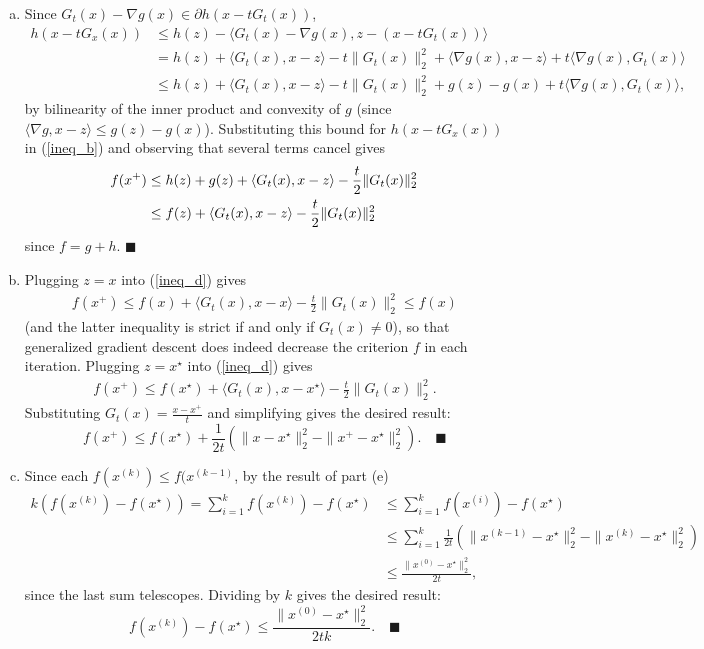 \documentclass[11pt]{article}
\newcommand{\qed}{\quad \ensuremath{\blacksquare}}
\begin{document}
\begin{enumerate}[(a)]
\newpage
\item Since $G_t(x) - \nabla g(x) \in \partial h(x - tG_t(x))$,
\begin{align*}
h(x - tG_x(x))
    & \leq h(z) - \langle G_t(x) - \nabla g(x), z - (x - tG_t(x)) \rangle  \\
    & =    h(z) + \langle G_t(x), x - z             \rangle
                - t\|     G_t(x)                    \|_2^2
                + \langle \nabla g(x), x - z        \rangle
                + t\langle \nabla g(x), G_t(x)      \rangle \\
    & \leq h(z) + \langle G_t(x), x - z             \rangle
                - t\|     G_t(x)                    \|_2^2
                + g(z) - g(x)
                + t\langle \nabla g(x), G_t(x)      \rangle,
\end{align*}
by bilinearity of the inner product and convexity of $g$ (since
$\langle \nabla g, x - z \rangle \leq g(z) - g(x)$). Substituting this bound
for $h(x - tG_x(x))$ in (\ref{ineq_b}) and observing that several terms cancel
gives
\begin{align}
\notag
f(x^+)
 &  \leq h(z) + g(z) + \langle G_t(x), x - z \rangle
    -    \frac{t}{2} \|G_t(x)\|_2^2 \\
\label{ineq_d}
 &  \leq f(z) + \langle G_t(x), x - z \rangle - \frac{t}{2} \|G_t(x)\|_2^2
\end{align}
since $f = g + h$. \qed
 
\item Plugging $z = x$ into (\ref{ineq_d}) gives
\begin{align*}
f(x^+)
    \leq f(x) + \langle G_t(x), x - x \rangle - \frac{t}{2} \|G_t(x)\|_2^2
    \leq f(x)
\end{align*}
(and the latter inequality is strict if and only if $G_t(x) \neq 0$), so that
generalized gradient descent does indeed decrease the criterion $f$ in each
iteration. Plugging $z = x^\star$ into (\ref{ineq_d}) gives
\begin{align*}
f(x^+)
    \leq f(x^\star) + \langle G_t(x), x - x^\star \rangle
    -    \frac{t}{2} \|G_t(x)\|_2^2.
\end{align*}
Substituting $G_t(x) = \frac{x - x^+}{t}$ and simplifying gives the desired
result:
\[f(x^+) \leq f(x^\star) + \frac{1}{2t}
    \left( \|x - x^\star\|_2^2 - \|x^+ - x^\star\|_2^2 \right). \qed\]
 
\item Since each $f(x^{(k)}) \leq f(x^{(k - 1)}$, by the result of part (e)
\begin{align*}
k(f(x^{(k)}) - f(x^\star))
    = \sum_{i = 1}^k f(x^{(k)}) - f(x^\star)
 &  \leq \sum_{i = 1}^k f(x^{(i)}) - f(x^\star) \\
 &  \leq \sum_{i = 1}^k \frac{1}{2t} \left(\|x^{(k - 1)} - x^\star\|_2^2
                                        - \|x^{(k)} - x^\star\|_2^2 \right) \\
 &  \leq \frac{\|x^{(0)} - x^\star\|_2^2}{2t},
\end{align*}
since the last sum telescopes. Dividing by $k$ gives the desired result:
\[f(x^{(k)}) - f(x^\star) \leq \frac{\|x^{(0)} - x^\star\|_2^2}{2tk}. \qed\]
 
\end{enumerate}
\end{document}
